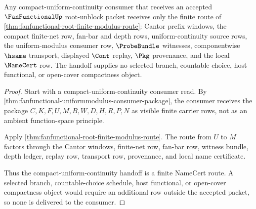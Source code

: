 \begin{theorem}
\label{thm:fanfunctional-compact-uniform-consumer-route}
Any compact-uniform-continuity consumer that receives an accepted
$\FanFunctionalUp$ root-unblock packet receives only the finite route of
\autoref{thm:fanfunctional-root-finite-modulus-route}: Cantor prefix windows,
the compact finite-net row, fan-bar and depth rows, uniform-continuity source
rows, the uniform-modulus consumer row, $\ProbeBundle$ witnesses,
componentwise $\hsame$ transport, displayed $\Cont$ replay, $\Pkg$
provenance, and the local $\NameCert$ row. The handoff supplies no selected
branch, countable choice, host functional, or open-cover compactness object.
\end{theorem}
\begin{proof}
Start with a compact-uniform-continuity consumer read. By
\autoref{thm:fanfunctional-uniformmodulus-consumer-package}, the consumer
receives the package $C,K,F,U,M,B,W,D,H,R,P,N$ as visible finite carrier
rows, not as an ambient function-space principle.

Apply \autoref{thm:fanfunctional-root-finite-modulus-route}. The route from
$U$ to $M$ factors through the Cantor windows, finite-net row, fan-bar row,
witness bundle, depth ledger, replay row, transport row, provenance, and local
name certificate.

Thus the compact-uniform-continuity handoff is a finite NameCert route. A
selected branch, countable-choice schedule, host functional, or open-cover
compactness object would require an additional row outside the accepted
packet, so none is delivered to the consumer.
\end{proof}

